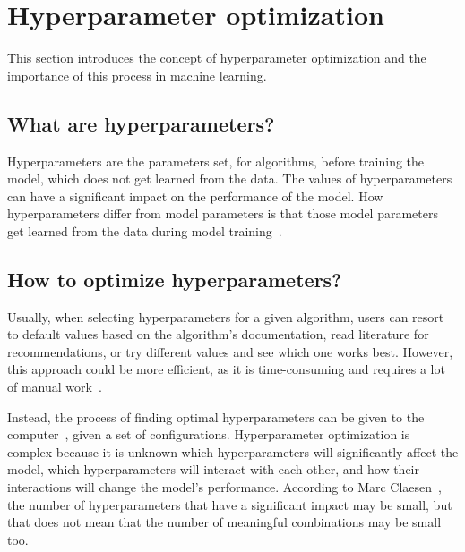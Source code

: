 \section{Hyperparameter optimization}\label{sec:hyperparam}
This section introduces the concept of hyperparameter optimization and the importance of this process in machine learning. 

\subsection{What are hyperparameters?}\label{subsec:hyperparam-what}
Hyperparameters are the parameters set, for algorithms, before training the model, which does not get learned from the data. The values of hyperparameters can have a significant impact on the performance of the model. How hyperparameters differ from model parameters is that those model parameters get learned from the data during model training~\cite{probst2019tunability}.


\subsection{How to optimize hyperparameters?}\label{subsec:hyperparam-how}
Usually, when selecting hyperparameters for a given algorithm, users can resort to default values based on the algorithm's documentation, read literature for recommendations, or try different values and see which one works best. However, this approach could be more efficient, as it is time-consuming and requires a lot of manual work~\cite{probst2019tunability}.

Instead, the process of finding optimal hyperparameters can be given to the computer~\cite{automated-machine-learning}, given a set of configurations. Hyperparameter optimization is complex because it is unknown which hyperparameters will significantly affect the model, which hyperparameters will interact with each other, and how their interactions will change the model's performance. According to Marc Claesen~\cite{hyperparam-search}, the number of hyperparameters that have a significant impact may be small, but that does not mean that the number of meaningful combinations may be small too. 

